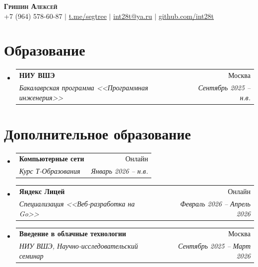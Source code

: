 \documentclass[letterpaper,11pt]{article}
\makeatletter
\newcommand{\resumeSubheading}[4]{
  \vspace{-2pt}\item
    \begin{tabular*}{0.97\textwidth}[t]{l@{\extracolsep{\fill}}r}
      \textbf{#1} & #2 \\
      \textit{\small#3} & \textit{\small #4} \\
    \end{tabular*}\vspace{-7pt}
}
\newcommand{\resumeSubHeadingListStart}{\begin{itemize}[leftmargin=0.15in, label={}]}
\newcommand{\resumeSubHeadingListEnd}{\end{itemize}}
\makeatother
\begin{document}

\begin{center}
    \textbf{\Huge \scshape Гришин Алексей} \\ \vspace{1pt}
    \small +7 (964) 578-60-87 $|$ 
    \href{https://t.me/segtree}{t.me/segtree} $|$
    \href{mailto:int28t@ya.ru}{int28t@ya.ru} $|$ 
    \href{https://github.com/int28t}{github.com/int28t}
\end{center}


\section{Образование}
  \resumeSubHeadingListStart
    \resumeSubheading
      {НИУ ВШЭ}{Москва}
      {Бакалаврская программа <<Программная инженерия>>}{Сентябрь 2025 -- н.в.}
  \resumeSubHeadingListEnd

\section{Дополнительное образование}
  \resumeSubHeadingListStart
    \resumeSubheading
      {Компьютерные сети}{Онлайн}
      {Курс Т-Образования}{Январь 2026 -- н.в.}
    \resumeSubheading
      {Яндекс Лицей}{Онлайн}
      {Специализация <<Веб‑разработка на Go>>}{Февраль 2026 -- Апрель 2026}
    \resumeSubheading
      {Введение в облачные технологии}{Москва}
      {НИУ ВШЭ, Научно-исследовательский семинар}{Сентябрь 2025 -- Март 2026}
  \resumeSubHeadingListEnd

\end{document}
